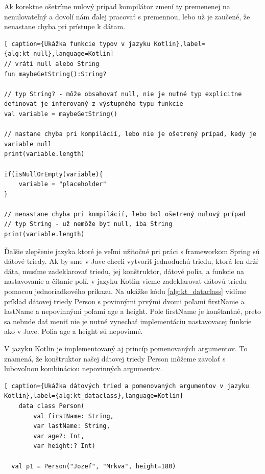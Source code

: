 Ak korektne ošetríme nulový prípad kompilátor zmení ty premenenej na nenulovateľný a dovolí nám ďalej pracovať s premennou, lebo už je zaučené, že nenastane chyba pri prístupe k dátam. 


\begin{lstlisting}[ caption={Ukážka funkcie typov v jazyku Kotlin},label={alg:kt_null},language=Kotlin]
// vráti null alebo String
fun maybeGetString():String?

// typ String? - môže obsahovať null, nie je nutné typ explicitne definovať je inferovaný z výstupného typu funkcie
val variable = maybeGetString()

// nastane chyba pri kompilácií, lebo nie je ošetrený prípad, kedy je variable null
print(variable.length)

if(isNullOrEmpty(variable){
	variable = "placeholder"
}

// nenastane chyba pri kompilácií, lebo bol ošetrený nulový prípad
// typ String - už nemôže byť null, iba String
print(variable.length)
\end{lstlisting}


Ďalšie zlepšenie jazyka ktoré je veľmi užitočné pri práci s frameworkom Spring sú dátové triedy. Ak by sme v Jave chceli vytvoriť jednoduchú triedu, ktorá len drží dáta, musíme zadeklarovať triedu, jej konštruktor, dátové polia, a funkcie na nastavovanie a čítanie polí. v jazyku Kotlin vieme zadeklarovať dátovú triedu pomocou jednoriadkového príkazu. Na ukážke kódu \ref{alg:kt_dataclass} vidíme príklad dátovej triedy Person s povinnými prvými dvomi poľami firstName a lastName a nepovinnými poľami age a height. Pole firstName je konštantné, preto sa nebude dať meniť nie je nutné vynechať implementáciu nastavovacej funkcie ako v Jave. Polia age a height sú nepovinné.  
 
V jazyku Kotlin je implementovaný aj princíp pomenovaných argumentov. To znamená, že konštruktor našej dátovej triedy Person môžeme zavolať s ľubovoľnou kombináciou nepovinných argumentov. 

\begin{lstlisting}[ caption={Ukážka dátových tried a pomenovaných argumentov v jazyku Kotlin},label={alg:kt_dataclass},language=Kotlin]
	data class Person(
		val firstName: String,
		var lastName: String,
		var age?: Int,
		var height:? Int)

  val p1 = Person("Jozef", "Mrkva", height=180)		
	\end{lstlisting}




